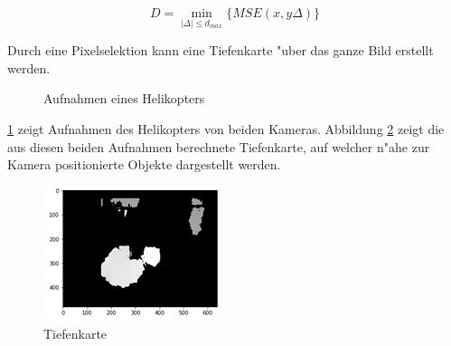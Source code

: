 \begin{equation}
D=\min_{|\Delta|\leq d_{max}} \{MSE(x,y\Delta)\}
\end{equation}

\noindent Durch eine Pixelselektion kann eine Tiefenkarte "uber das ganze Bild erstellt werden.

\begin{figure}%
	\centering
	\qquad
	\caption{Aufnahmen eines Helikopters}%
	\label{fig:stereoheli}%
\end{figure}

\noindent \ref{fig:stereoheli} zeigt Aufnahmen des Helikopters von beiden Kameras. Abbildung \ref{fig:tiefenkarte} zeigt die aus diesen beiden Aufnahmen berechnete Tiefenkarte, auf welcher n"ahe zur Kamera positionierte Objekte dargestellt werden.

\begin{figure}[H]
	\includegraphics[scale=2.0]{bilder/Tiefenkarte}
	\caption[Tiefenkarte]{Tiefenkarte}
	\label{fig:tiefenkarte}%
\end{figure}

